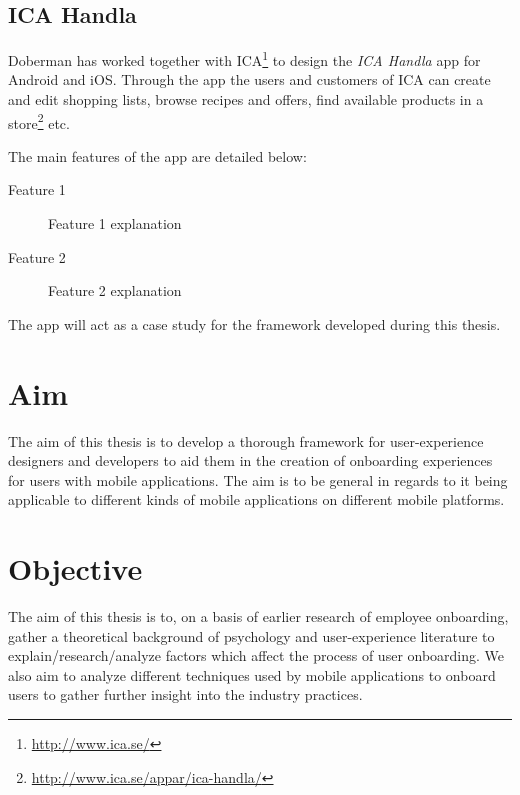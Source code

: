\subsection{ICA Handla}
Doberman has worked together with ICA\footnote{\url{http://www.ica.se/}} to design the \textit{ICA Handla} app for Android and iOS. Through the app the users and customers of ICA can create and edit shopping lists, browse recipes and offers, find available products in a store\footnote{\url{http://www.ica.se/appar/ica-handla/}} etc.

The main features of the app are detailed below:

\begin{description}
  \item[Feature 1] Feature 1 explanation
  \item[Feature 2] Feature 2 explanation
\end{description}

The app will act as a case study for the framework developed during this thesis.

\section{Aim}
The aim of this thesis is to develop a thorough framework for user-experience designers and developers to aid them in the creation of onboarding experiences for users with mobile applications. The aim is to be general in regards to it being applicable to different kinds of mobile applications on different mobile platforms.

\section{Objective}
The aim of this thesis is to, on a basis of earlier research of employee onboarding, gather a theoretical background of psychology and user-experience literature to explain/research/analyze factors which affect the process of user onboarding. We also aim to analyze different techniques used by mobile applications to onboard users to gather further insight into the industry practices.

